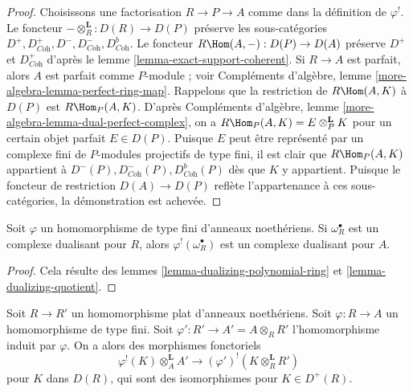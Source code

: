 \begin{proof}
Choisissons une factorisation $R \to P \to A$ comme dans la définition de $\varphi^!$.
Le foncteur $- \otimes_R^\mathbf{L} : D(R) \to D(P)$ préserve les sous-catégories $D^+, D^+_{\textit{Coh}}, D^-, D^-_{\textit{Coh}}, D^b_{\textit{Coh}}$.
Le foncteur $R\Hom(A, -) : D(P) \to D(A)$ préserve $D^+$ et $D^+_{\textit{Coh}}$ d'après le lemme \ref{lemma-exact-support-coherent}.
Si $R \to A$ est parfait, alors $A$ est parfait comme $P$-module ;
voir Compléments d'algèbre, lemme \ref{more-algebra-lemma-perfect-ring-map}.
Rappelons que la restriction de $R\Hom(A, K)$ à $D(P)$ est $R\Hom_P(A, K)$.
D'après Compléments d'algèbre, lemme \ref{more-algebra-lemma-dual-perfect-complex}, on a $R\Hom_P(A, K) = E \otimes_P^\mathbf{L} K$
pour un certain objet parfait $E \in D(P)$.
Puisque $E$ peut être représenté par un complexe fini de $P$-modules
projectifs de type fini, il est clair que $R\Hom_P(A, K)$ appartient à $D^-(P), D^-_{\textit{Coh}}(P), D^b_{\textit{Coh}}(P)$
dès que $K$ y appartient.
Puisque le foncteur de restriction $D(A) \to D(P)$ reflète l'appartenance
à ces sous-catégories, la démonstration est achevée.
\end{proof}

\begin{lemma}
\label{lemma-shriek-dualizing-algebraic}
Soit $\varphi$ un homomorphisme de type fini d'anneaux noethériens.
Si $\omega_R^\bullet$ est un complexe dualisant pour $R$,
alors $\varphi^!(\omega_R^\bullet)$ est un complexe dualisant pour $A$.
\end{lemma}

\begin{proof}
Cela résulte des lemmes \ref{lemma-dualizing-polynomial-ring} et \ref{lemma-dualizing-quotient}.
\end{proof}

\begin{lemma}
\label{lemma-flat-bc}
Soit $R \to R'$ un homomorphisme plat d'anneaux noethériens.
Soit $\varphi : R \to A$ un homomorphisme de type fini.
Soit $\varphi' : R' \to A' = A \otimes_R R'$ l'homomorphisme induit par $\varphi$.
On a alors des morphismes fonctoriels
$$
\varphi^!(K) \otimes_A^\mathbf{L} A' \longrightarrow
(\varphi')^!(K \otimes_R^\mathbf{L} R')
$$
pour $K$ dans $D(R)$, qui sont des isomorphismes pour $K \in D^+(R)$.
\end{lemma}

